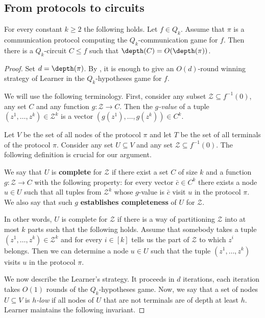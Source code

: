 \subsection{From protocols to circuits} \label{subsec:prot_to_circ}
\begin{proposition}
\label{Q_k_to_circuits}
For every constant $k\ge 2$ the following holds. Let $f\in Q_k$. Assume that $\pi$ is a communication protocol computing the $Q_k$-communication game for $f$. Then there is a $Q_k$-circuit $C \le f$ such that $\depth(C) = O(\depth(\pi))$.
\end{proposition}
\begin{proof}



Set $d = \depth(\pi)$. By ,
it is enough to give an $O(d)$-round winning strategy of Learner in the $Q_k$-hypotheses game for $f$.

We will use the following terminology. First, consider any subset $\mathcal{Z}\subseteq f^{-1}(0)$, any set $C$ and any function $g\colon \mathcal{Z}\to C$. Then the \emph{$g$-value} of a tuple $(z^1, \ldots, z^k) \in \mathcal{Z}^k$  is a vector $(g(z^1), \ldots, g(z^k)) \in C^k$.

Let $V$ be the set of all nodes of the protocol $\pi$ and let $T$ be the set of all terminals of the protocol $\pi$. Consider any set $U\subseteq V$ and any set $\mathcal{Z}\subseteq f^{-1}(0)$. The following definition is crucial for our argument.
\begin{definition}
 We say that $U$ is \textbf{complete} for $\mathcal{Z}$ if there exist a set $C$ of size $k$ and a function $g\colon\mathcal{Z}\to C$ with the following property: for every vector $\bar{c}\in C^k$ there exists a node $u\in U$ such that all tuples from $\mathcal{Z}^k$ whose $g$-value is $\bar{c}$ visit $u$ in the protocol $\pi$. We also say that such $g$ \textbf{establishes completeness} of $U$ for $\mathcal{Z}$.
\end{definition}

In other words, $U$ is complete for $\mathcal{Z}$ if there is a way of partitioning $\mathcal{Z}$ into at most $k$ parts such that the following holds. Assume that somebody takes a tuple $(z^1, \ldots, z^k)\in\mathcal{Z}^k$ and for every $i\in [k]$ tells us the part of $\mathcal{Z}$ to which $z^i$ belongs. Then we can determine a node $u\in U$ such that the tuple $(z^1, \ldots, z^k)$ visits $u$ in the protocol $\pi$.

We now describe the Learner's strategy. It proceeds in $d$ iterations, each iteration takes $O(1)$ rounds of the $Q_k$-hypotheses game. Now, we say that a set of nodes $U\subseteq V$ is \emph{$h$-low} if all nodes of $U$ that are not terminals are of depth at least $h$. Learner maintains the following invariant.


\end{proof}
